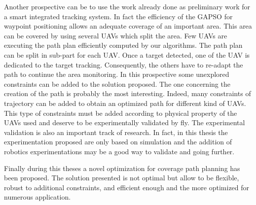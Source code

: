 Another prospective can be to use the work already done as preliminary work for a smart integrated tracking system. In	fact the efficiency of the GAPSO  for waypoint positioning allows an adequate coverage of an important area. This area can be covered by using several UAVs which split the area. Few UAVs are executing the path plan efficiently computed by our algorithms. The path plan can be split in sub-part for each UAV. Once a target detected, one of the UAV is dedicated to the target tracking. Consequently, the others have to re-adapt the path to continue the area monitoring. In this prospective some unexplored constraints can be added to the solution proposed.
The one concerning the creation of the path is probably the most interesting.  Indeed, many constraints of trajectory can be added to obtain an optimized path for different kind of UAVs. This type of constraints must be added according to physical property of the UAVs used and deserve to be experimentally validated by fly. 
The experimental validation is also an important track of research. In fact, in this thesis the experimentation proposed are only based on simulation and the addition of robotics experimentations may be a good way to validate  and going further.  



Finally during this theses a novel optimization for coverage path planning has been proposed. The solution presented is not optimal but allow to be flexible, robust to additional constraints, and efficient enough and the more optimized for numerous application.




